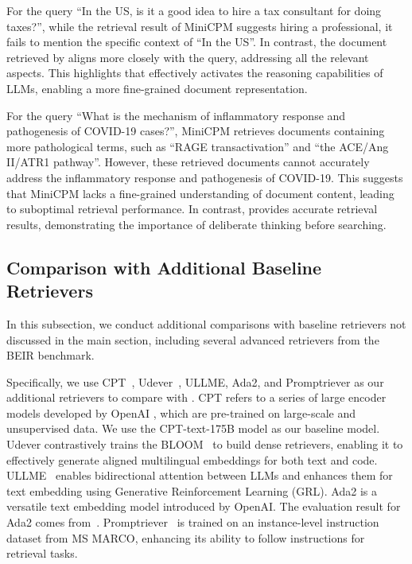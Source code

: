 For the query ``In the US, is it a good idea to hire a tax consultant for doing taxes?'', while the retrieval result of MiniCPM suggests hiring a professional, it fails to mention the specific context of ``In the US''. 
In contrast, the document retrieved by \method{} aligns more closely with the query, addressing all the relevant aspects. This highlights that \method{} effectively activates the reasoning capabilities of LLMs, enabling a more fine-grained document representation.

For the query ``What is the mechanism of inflammatory response and pathogenesis of COVID-19 cases?'', MiniCPM retrieves documents containing more pathological terms, such as ``RAGE transactivation'' and ``the ACE/Ang II/ATR1 pathway''. 
However, these retrieved documents cannot accurately address the inflammatory response and pathogenesis of COVID-19. This suggests that MiniCPM lacks a fine-grained understanding of document content, leading to suboptimal retrieval performance. In contrast, \method{} provides accurate retrieval results, demonstrating the importance of deliberate thinking before searching.



\subsection{Comparison with Additional Baseline Retrievers}
\label{app:comparison}
In this subsection, we conduct additional comparisons with baseline retrievers not discussed in the main section, including several advanced retrievers from the BEIR benchmark.

Specifically, we use CPT~\cite{neelakantan2022text}, Udever~\cite{zhang2023languagemodelsuniversalembedders}, ULLME, Ada2, and Promptriever as our additional retrievers to compare with \method{}.
CPT refers to a series of large encoder models developed by OpenAI \cite{brown2020language}, which are pre-trained on large-scale and unsupervised data. We use the CPT-text-175B model as our baseline model.   
Udever contrastively trains the BLOOM~\cite{workshop2023bloom176bparameteropenaccessmultilingual} to build dense retrievers, enabling it to effectively generate aligned multilingual embeddings for both text and code. 
ULLME~\cite{man-etal-2024-ullme} enables bidirectional attention between LLMs and enhances them for text embedding using Generative Reinforcement Learning (GRL).
Ada2 is a versatile text embedding model introduced by OpenAI. The evaluation result for Ada2 comes from~\citet{kamalloo-etal-2023-evaluating-embedding}. 
Promptriever~\cite{weller2025promptriever} is trained on an instance-level instruction dataset from MS MARCO, enhancing its ability to follow instructions for retrieval tasks.

